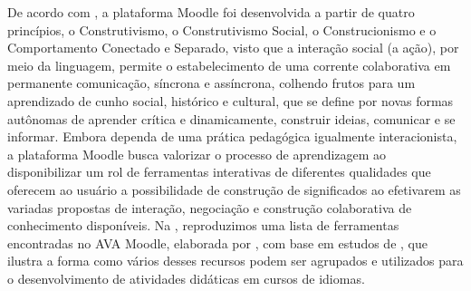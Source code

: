 De acordo com \textcite{thomaz_principios_2022}, a plataforma Moodle foi desenvolvida a partir de quatro princípios, o Construtivismo, o Construtivismo Social, o Construcionismo e o Comportamento Conectado e Separado, visto que a
interação social (a ação), por meio da linguagem, permite o
estabelecimento de uma corrente colaborativa em permanente comunicação,
síncrona e assíncrona, colhendo frutos para um aprendizado de cunho
social, histórico e cultural, que se define por novas formas autônomas
de aprender crítica e dinamicamente, construir ideias, comunicar e se
informar. Embora dependa de uma prática pedagógica igualmente
interacionista, a plataforma Moodle busca valorizar o processo de
aprendizagem ao disponibilizar um rol de ferramentas interativas de
diferentes qualidades que oferecem ao usuário a possibilidade de
construção de significados ao efetivarem as variadas propostas de
interação, negociação e construção colaborativa de conhecimento
disponíveis. Na , reproduzimos uma lista de ferramentas encontradas no AVA Moodle, elaborada por \textcite{mayrink_ensino_2017}, com
base em estudos de \textcite{valente_educacao_2011}, que ilustra a forma como vários desses recursos podem ser agrupados e utilizados para o desenvolvimento
de atividades didáticas em cursos de idiomas.

